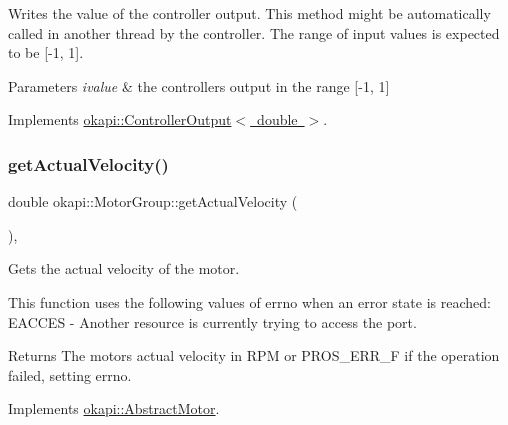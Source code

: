 Writes the value of the controller output. This method might be automatically called in another thread by the controller. The range of input values is expected to be {\ttfamily \mbox{[}-\/1, 1\mbox{]}}.


\begin{DoxyParams}{Parameters}
{\em ivalue} & the controller\textquotesingle{}s output in the range {\ttfamily \mbox{[}-\/1, 1\mbox{]}} \\
\hline
\end{DoxyParams}


Implements \mbox{\hyperlink{classokapi_1_1ControllerOutput_a360c08f0c10b36f882d6d3100c2cad49}{okapi\+::\+Controller\+Output$<$ double $>$}}.

\mbox{\label{classokapi_1_1MotorGroup_a5cbb95146d4663440632a9e3ccc99ae9}} 
\subsubsection{\texorpdfstring{getActualVelocity()}{getActualVelocity()}}
{\footnotesize\ttfamily double okapi\+::\+Motor\+Group\+::get\+Actual\+Velocity (\begin{DoxyParamCaption}{ }\end{DoxyParamCaption})\hspace{0.3cm}{\ttfamily [override]}, {\ttfamily [virtual]}}

Gets the actual velocity of the motor.

This function uses the following values of errno when an error state is reached\+: E\+A\+C\+C\+ES -\/ Another resource is currently trying to access the port.

\begin{DoxyReturn}{Returns}
The motor\textquotesingle{}s actual velocity in R\+PM or {\ttfamily P\+R\+O\+S\+\_\+\+E\+R\+R\+\_\+F} if the operation failed, setting errno. 
\end{DoxyReturn}


Implements \mbox{\hyperlink{classokapi_1_1AbstractMotor_a45b2013cc318577fad4ac38ad22ce219}{okapi\+::\+Abstract\+Motor}}.

\mbox{\label{classokapi_1_1MotorGroup_a96fb47ca2da80930123c2b7e7176befb}} 
